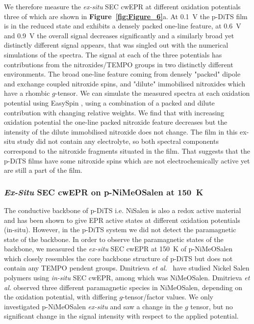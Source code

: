 \documentclass{WileyMSP-template}
\begin{document}
\bigbreak

We therefore measure the \textit{ex-situ} SEC cwEPR at different oxidation potentials three of which are shown in \textbf{Figure~\ref{fig:Figure_6}}a. At 0.1~V the p-DiTS film is in the reduced state and exhibits a densely packed one-line feature, at 0.6~V and 0.9~V the overall signal decreases significantly and a similarly broad yet distinctly different signal appears, that was singled out with the numerical simulations of the spectra. The signal at each of the three potentials has contributions from the nitroxides/TEMPO groups in two distinctly different environments. The broad one-line feature coming from densely "packed" dipole and exchange coupled nitroxide spins, and "dilute" immobilised nitroxides which have a rhombic $g$-tensor. We can simulate the measured spectra at each oxidation potential using EasySpin \cite{Stoll2006}, using a combination of a packed and dilute contribution with changing relative weights. We find that with increasing oxidation potential the one-line packed nitroxide feature decreases but the intensity of the dilute immobilised nitroxide does not change. The film in this ex-situ study did not contain any electrolyte, so both spectral components correspond to the nitroxide fragments situated in the film. That suggests that the p-DiTS films have some nitroxide spins which are not electrochemically active yet are still a part of the film.

\bigbreak

\subsubsection*{\textit{Ex-Situ} SEC cwEPR on p-NiMeOSalen at 150~K}

The conductive backbone of p-DiTS i.e. NiSalen is also a redox active material and has been shown to give EPR active states at different oxidation potentials (in-situ). However, in the p-DiTS system we did not detect the paramagnetic state of the backbone. In order to observe the paramagnetic states of the backbone, we measured the \textit{ex-situ} SEC cwEPR at 150~K of p-NiMeOSalen which closely resembles the core backbone structure of p-DiTS but does not contain any TEMPO pendent groups. Dmitrieva \textit{et al.}~\cite{Dmitrieva2018} have studied Nickel Salen polymers using \textit{in-situ} SEC cwEPR, among which was NiMeOSalen. Dmitrieva \textit{et al.} observed three different paramagnetic species in NiMeOSalen, depending on the oxidation potential, with differing $g$-tensor/factor values. We only investigated p-NiMeOSalen \textit{ex-situ} and saw a change in the $g$ tensor, but no significant change in the signal intensity with respect to the applied potential. 
\end{document}
